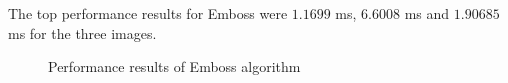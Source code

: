 The top performance results for Emboss were $ 1.1699 $ ms, $ 6.6008 $ ms  and $ 1.90685 $ ms for the three images.

\begin{center}
    \begin{figure}[H]
        \centering
        
        \caption{Performance results of Emboss algorithm}
    \end{figure}
\end{center}
